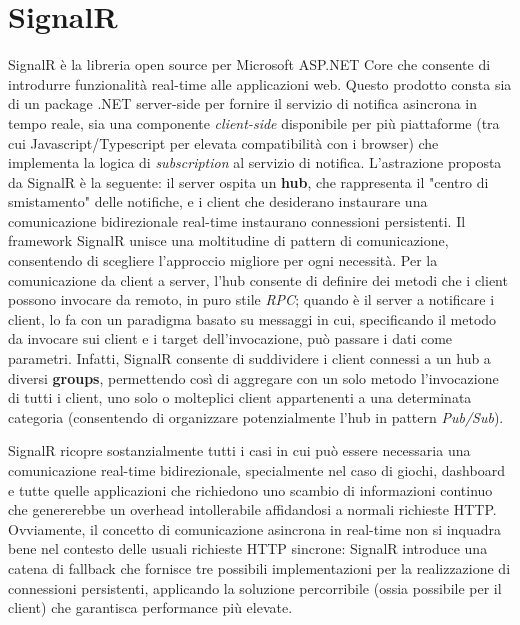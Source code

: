 \section{SignalR}
SignalR è la libreria open source per Microsoft ASP.NET Core che consente di introdurre funzionalità real-time alle applicazioni web.
Questo prodotto consta sia di un package .NET server-side per fornire il servizio di notifica asincrona in tempo reale, sia una componente \emph{client-side} disponibile per più piattaforme (tra cui Javascript/Typescript per elevata compatibilità con i browser) che implementa la logica di \emph{subscription} al servizio di notifica.
L'astrazione proposta da SignalR è la seguente: il server ospita un \textbf{hub}, che rappresenta il "centro di smistamento" delle notifiche, e i client che desiderano instaurare una comunicazione bidirezionale real-time instaurano connessioni persistenti.
Il framework SignalR unisce una moltitudine di pattern di comunicazione, consentendo di scegliere l'approccio migliore per ogni necessità.
Per la comunicazione da client a server, l'hub consente di definire dei metodi che i client possono invocare da remoto, in puro stile \emph{RPC}; quando è il server a notificare i client, lo fa con un paradigma basato su messaggi in cui, specificando il metodo da invocare sui client e i target dell'invocazione, può passare i dati come parametri. Infatti, SignalR consente di suddividere i client connessi a un hub a diversi \textbf{groups}, permettendo così di aggregare con un solo metodo l'invocazione di tutti i client, uno solo o molteplici client appartenenti a una determinata categoria (consentendo di organizzare potenzialmente l'hub in pattern \emph{Pub/Sub}).

SignalR ricopre sostanzialmente tutti i casi in cui può essere necessaria una comunicazione real-time bidirezionale, specialmente nel caso di giochi, dashboard e tutte quelle applicazioni che richiedono uno scambio di informazioni continuo che genererebbe un overhead intollerabile affidandosi a normali richieste HTTP.
Ovviamente, il concetto di comunicazione asincrona in real-time non si inquadra bene nel contesto delle usuali richieste HTTP sincrone: SignalR introduce una catena di fallback che fornisce tre possibili implementazioni per la realizzazione di connessioni persistenti, applicando la soluzione percorribile (ossia possibile per il client) che garantisca performance più elevate.

